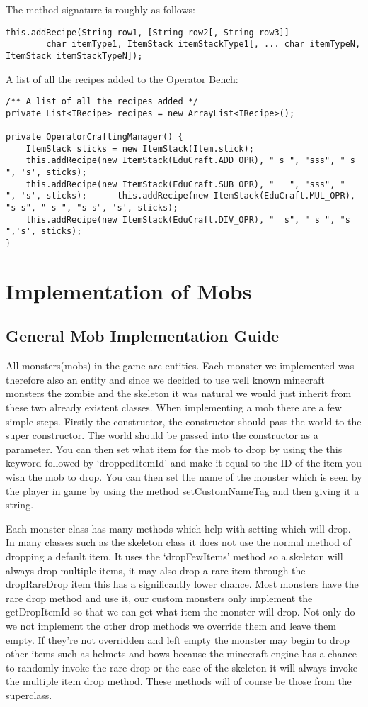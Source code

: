 The method signature is roughly as follows:
\begin{lstlisting}
this.addRecipe(String row1, [String row2[, String row3]]
        char itemType1, ItemStack itemStackType1[, ... char itemTypeN, ItemStack itemStackTypeN]);
\end{lstlisting}
A list of all the recipes added to the Operator Bench:
\begin{lstlisting}
/** A list of all the recipes added */
private List<IRecipe> recipes = new ArrayList<IRecipe>();

private OperatorCraftingManager() {
	ItemStack sticks = new ItemStack(Item.stick);
	this.addRecipe(new ItemStack(EduCraft.ADD_OPR), " s ", "sss", " s ", 's', sticks);
	this.addRecipe(new ItemStack(EduCraft.SUB_OPR), "   ", "sss", "   ", 's', sticks);		this.addRecipe(new ItemStack(EduCraft.MUL_OPR), "s s", " s ", "s s", 's', sticks);
	this.addRecipe(new ItemStack(EduCraft.DIV_OPR), "  s", " s ", "s  ",'s', sticks);
}
\end{lstlisting}

\section{Implementation of Mobs}
\subsection{General Mob Implementation Guide}
All monsters(mobs) in the game are entities. Each monster we implemented was therefore also an entity and since we decided to use well known minecraft monsters the zombie and the skeleton it was natural we would just inherit from these two already existent classes. When implementing a mob there are a few simple steps. Firstly the constructor, the constructor should pass the world to the super constructor. The world should be passed into the constructor as a parameter. You can then set what item for the mob to drop by using the this keyword followed by ‘droppedItemId’ and make it equal to the ID of the item you wish the mob to drop. You can then set the name of the monster which is seen by the player in game by using the method setCustomNameTag and then giving it a string.

Each monster class has many methods which help with setting which will drop. In many classes such as the skeleton class it does not use the normal method of dropping a default item. It uses the ‘dropFewItems’ method so a skeleton will always drop multiple items, it may also drop a rare item through the dropRareDrop item this has a significantly lower chance. Most monsters have the rare drop method and use it, our custom monsters only implement the getDropItemId so that we can get what item the monster will drop. Not only do we not implement the other drop methods we override them and leave them empty. If they’re not overridden and left empty the monster may begin to drop other items such as helmets and bows because the minecraft engine has a chance to randomly invoke the rare drop or the case of the skeleton it will always invoke the multiple item drop method. These methods will of course be those from the superclass.

